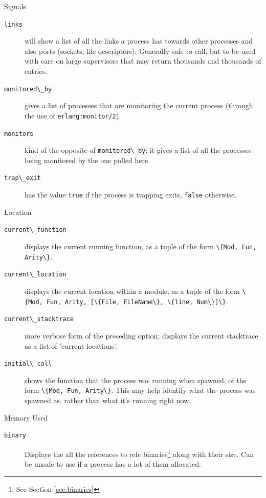 \documentclass[11pt, oneside]{book}   	%
\newcommand{\function}[1]{\Verb`#1`}
\newcommand{\expression}[1]{\Verb`#1`}
\begin{document}
\begin{description*}
\begin{description}
		\end{description}
	\item[Signals] \hfill
		\begin{description}
			\item[\expression{links}] will show a list of all the links a process has towards other processes and also ports (sockets, file descriptors). Generally safe to call, but to be used with care on large supervisors that may return thousands and thousands of entries.
			
			\item[\expression{monitored\_by}] gives a list of processes that are monitoring the current process (through the use of \function{erlang:monitor/2}).
			
			\item[\expression{monitors}] kind of the opposite of \expression{monitored\_by}; it gives a list of all the processes being monitored by the one polled here.
					
			\item[\expression{trap\_exit}] has the value \expression{true} if the process is trapping exits, \expression{false} otherwise.
		\end{description}		
		
	\item[Location] \hfill
		\begin{description}
			\item[\expression{current\_function}] displays the current running function, as a tuple of the form \expression{\{Mod, Fun, Arity\}}.

			\item[\expression{current\_location}] displays the current location within a module, as a tuple of the form \expression{\{Mod, Fun, Arity, [\{File, FileName\}, \{line, Num\}]\}}.
			
			\item[\expression{current\_stacktrace}] more verbose form of the preceding option; displays the current stacktrace as a list of 'current locations'.
			
			\item[\expression{initial\_call}] shows the function that the process was running when spawned, of the form \expression{\{Mod, Fun, Arity\}}. This may help identify what the process was spawned as, rather than what it's running right now.
			
		\end{description}
	\item[Memory Used] \hfill
		\begin{description}
			\item[\expression{binary}] Displays the all the references to refc binaries\footnote{See Section \ref{sec:binaries}} along with their size. Can be unsafe to use if a process has a lot of them allocated.
			

\end{description}
\end{description*}
\end{document}
